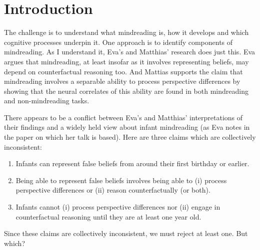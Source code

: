 \documentclass[12pt,\papersize]{extarticle}
\begin{document}
\setlength\footnotesep{1em}


\maketitle
\title{}

\begin{abstract}
\noindent
***


\end{abstract}


\section{Introduction}
The challenge is to understand what mindreading is, how it develops and which cognitive processes underpin it.
One approach is to identify components of mindreading.
As I understand it, Eva's and Matthias' research does just this.
Eva argues that mindreading, at least insofar as it involves representing beliefs, may depend on counterfactual reasoning too.
And Mattias supports the claim that mindreading involves a separable ability to process perspective differences by showing that the neural correlates of this ability are found in both mindreading and non-mindreading tasks.

There appears to be a conflict between Eva's and Matthias' interpretations of their findings and a widely held view about infant mindreading (as Eva notes in the paper on which her talk is based).
Here are three claims which are collectively inconsistent:
%
\begin{enumerate}
\item Infants can represent false beliefs from around their first birthday or earlier. \label{infant_fb}

\item Being able to represent false beliefs involves being able to  (i) process perspective differences or (ii) reason counterfactually (or both). \label{fb_is_perspectives}

\item Infants cannot (i) process perspective differences nor (ii) engage in counterfactual reasoning until they are at least one year old.  \label{infant_perspectives}

\end{enumerate}
%
Since these claims are collectively inconsistent, we must reject at least one.  But which?
\end{document}

